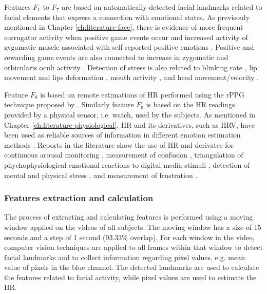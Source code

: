 Features $F_1$ to $F_7$ are based on automatically detected facial landmarks related to facial elements that express a connection with emotional states. As previsouly mentioned in Chapter \ref{ch:literature-face}, there is evidence of more frequent corrugator activity when positive game events occur \parencite{hazlett2006measuring} and increased activity of zygomatic muscle associated with self-reported positive emotions \parencite{tijs2008dynamic}. Positive and rewarding game events are also connected to increase in zygomatic and orbicularis oculi activity \parencite{ravaja20051}. Detection of stress is also related to blinking rate \parencite{giannakakis2017stress,dinges2005optical}, lip movement \parencite{dinges2005optical} and lips deformation \parencite{metaxas2004image,giannakakis2017stress}, mouth activity \parencite{liao2005decision}, and head movement/velocity \parencite{giannakakis2017stress}.

Feature $F_8$ is based on remote estimations of HR performed using the rPPG technique proposed by \textcite{poh2011advancements}. Similarly feature $F_9$ is based on the HR readings provided by a physical sensor, i.e. watch, used by the subjects. As mentioned in Chapter \ref{ch:literature-physiological}, HR and its derivatives, such as HRV, have been used as reliable sources of information in different emotion estimation methods \parencite{kukolja2014comparative}. Reports in the literature show the use of HR and derivates for continuous arousal monitoring \parencite{grundlehner2009design}, measurement of confusion \parencite{xiao2015towards}, triangulation of phychophysiological emotional reactions to digital media stimuli \parencite{nogueira2015annotation}, detection of mental and physical stress \parencite{vandeput2009heart,garde2002effects}, and measurement of frustration \parencite{rodriguez2015vr}.

\subsubsection{Features extraction and calculation}

The process of extracting and calculating features is performed using a moving window applied on the videos of all subjects. The moving window has a size of 15 seconds and a step of 1 second (93.33\% overlap). For each window in the video, computer vision techniques are applied to all frames within that window to detect facial landmarks and to collect information regarding pixel values, e.g. mean value of pixels in the blue channel. The detected landmarks are used to calculate the features related to facial activity, while pixel values are used to estimate the HR.

